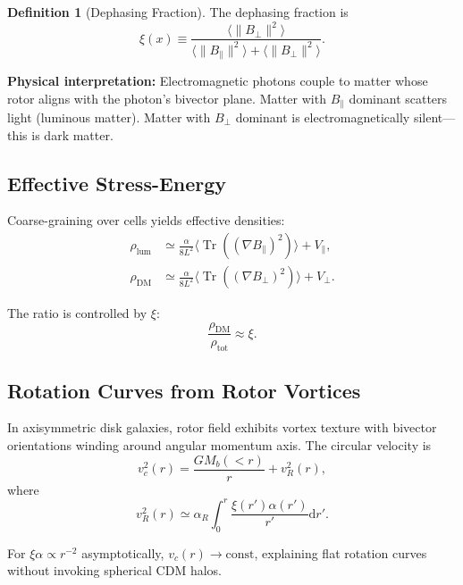 \documentclass[11pt,a4paper]{article}
\numberwithin{equation}{section}
\theoremstyle{plain}
\theoremstyle{definition}
\newtheorem{definition}[theorem]{Definition}
\theoremstyle{remark}
\DeclareMathOperator{\Tr}{Tr}
\newcommand{\dd}{\mathrm{d}}
\begin{document}
\begin{definition}[Dephasing Fraction]
The dephasing fraction is
\begin{equation}
\xi(x) \equiv \frac{\langle \|B_\perp\|^2 \rangle}{\langle \|B_\parallel\|^2 \rangle + \langle \|B_\perp\|^2 \rangle}.
\label{eq:dephasing-fraction}
\end{equation}
\end{definition}

\textbf{Physical interpretation:} Electromagnetic photons couple to matter whose rotor aligns with the photon's bivector plane. Matter with $B_\parallel$ dominant scatters light (luminous matter). Matter with $B_\perp$ dominant is electromagnetically silent—this is dark matter.

\subsection{Effective Stress-Energy}

Coarse-graining over cells yields effective densities:
\begin{align}
\rho_{\mathrm{lum}} &\simeq \frac{\alpha}{8L^2}\langle\Tr((\nabla B_\parallel)^2)\rangle + V_\parallel,\\
\rho_{\mathrm{DM}} &\simeq \frac{\alpha}{8L^2}\langle\Tr((\nabla B_\perp)^2)\rangle + V_\perp.
\end{align}

The ratio is controlled by $\xi$:
\begin{equation}
\frac{\rho_{\mathrm{DM}}}{\rho_{\mathrm{tot}}} \approx \xi.
\end{equation}

\subsection{Rotation Curves from Rotor Vortices}

In axisymmetric disk galaxies, rotor field exhibits vortex texture with bivector orientations winding around angular momentum axis. The circular velocity is
\begin{equation}
v_c^2(r) = \frac{GM_b(<r)}{r} + v_R^2(r),
\label{eq:rotation-curve}
\end{equation}
where
\begin{equation}
v_R^2(r) \simeq \alpha_R \int_0^r \frac{\xi(r')\alpha(r')}{r'}\dd r'.
\end{equation}

For $\xi\alpha \propto r^{-2}$ asymptotically, $v_c(r) \to \mathrm{const}$, explaining flat rotation curves without invoking spherical CDM halos.
\end{document}
